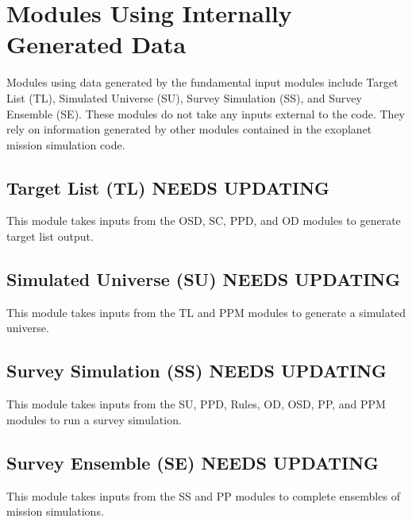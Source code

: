 \documentclass[]{asme2ej}
\begin{document}

\section{Modules Using Internally Generated Data}
Modules using data generated by the fundamental input modules include Target List (TL), Simulated Universe (SU), Survey Simulation (SS), and Survey Ensemble (SE). These modules do not take any inputs external to the code.  They rely on information generated by other modules contained in the exoplanet mission simulation code.


\subsection{Target List (TL) NEEDS UPDATING}
This module takes inputs from the OSD, SC, PPD, and OD modules to generate target list output.


\subsection{Simulated Universe (SU) NEEDS UPDATING}
This module takes inputs from the TL and PPM modules to generate a simulated universe.


\subsection{Survey Simulation (SS) NEEDS UPDATING}
This module takes inputs from the SU, PPD, Rules, OD, OSD, PP, and PPM modules to run a survey simulation.


\subsection{Survey Ensemble (SE) NEEDS UPDATING}
This module takes inputs from the SS and PP modules to complete ensembles of mission simulations.
\end{document}
